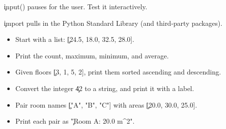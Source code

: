 \noindent
\c{input()} pauses for the user. Test it interactively.




\c{import} pulls in the Python Standard Library (and third-party packages).



\begin{itemize}
    \item Start with a list: \c{[24.5, 18.0, 32.5, 28.0]}.
    \item Print the count, maximum, minimum, and average.
\end{itemize}


\begin{itemize}
    \item Given floors \c{[3, 1, 5, 2]}, print them sorted ascending and descending.
    \item Convert the integer \c{42} to a string, and print it with a label.
\end{itemize}


\begin{itemize}
    \item Pair room names \c{["A", "B", "C"]} with areas \c{[20.0, 30.0, 25.0]}.
    \item Print each pair as \c{"Room A: 20.0 m^2"}.
\end{itemize}



